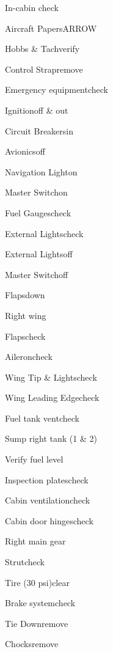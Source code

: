




\begin{multicols}{2}
\begin{checklist}{In-cabin check}
  \item{Aircraft Papers}{ARROW}
  \item{Hobbs \& Tach}{verify}
  \item{Control Strap}{remove}
  \item{Emergency equipment}{check}
  \item{Ignition}{off \& out}
  \item{Circuit Breakers}{in}
  \item{Avionics}{off}
  \item{Navigation Light}{on}
  \item{Master Switch}{on}
  \item{Fuel Gauges}{check}
  \item{External Lights}{check}
  \item{External Lights}{off}
  \item{Master Switch}{off}
  \item{Flaps}{down}
\end{checklist}

\begin{checklist}{Right wing}
  \item{Flaps}{check}
  \item{Aileron}{check}
  \item{Wing Tip \& Lights}{check}
  \item{Wing Leading Edge}{check}
  \item{Fuel tank vent}{check}
  \item{Sump right tank (1 \& 2)}{}
  \item{Verify fuel level}{}
  \item{Inspection plates}{check}
  \item{Cabin ventilation}{check}
  \item{Cabin door hinges}{check}
\end{checklist}

\begin{checklist}{Right main gear}
  \item{Strut}{check}
  \item{Tire (30 psi)}{clear}
  \item{Brake system}{check}
  \item{Tie Down}{remove}
  \item{Chocks}{remove}
\end{checklist}


\end{multicols}
